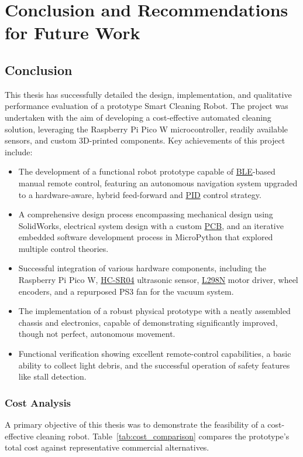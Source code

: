 \chapter{Conclusion and Recommendations for Future Work}
\label{chap:conclusion_future_work_new}

\section{Conclusion}
\label{sec:conclusion_summary_new}
This thesis has successfully detailed the design, implementation, and qualitative performance evaluation of a prototype Smart Cleaning Robot. The project was undertaken with the aim of developing a cost-effective automated cleaning solution, leveraging the Raspberry Pi Pico W microcontroller, readily available sensors, and custom 3D-printed components.
Key achievements of this project include:
\begin{itemize}
    \item The development of a functional robot prototype capable of \hyperref[term:ble]{BLE}-based manual remote control, featuring an autonomous navigation system upgraded to a hardware-aware, hybrid feed-forward and \hyperref[term:pid]{PID} control strategy.
    \item A comprehensive design process encompassing mechanical design using SolidWorks, electrical system design with a custom \hyperref[term:pcb]{PCB}, and an iterative embedded software development process in MicroPython that explored multiple control theories.
    \item Successful integration of various hardware components, including the Raspberry Pi Pico W, \hyperref[term:hcsr04]{HC-SR04} ultrasonic sensor, \hyperref[term:l298n]{L298N} motor driver, wheel encoders, and a repurposed PS3 fan for the vacuum system.
    \item The implementation of a robust physical prototype with a neatly assembled chassis and electronics, capable of demonstrating significantly improved, though not perfect, autonomous movement.
    \item Functional verification showing excellent remote-control capabilities, a basic ability to collect light debris, and the successful operation of safety features like stall detection.
\end{itemize}

\subsection{Cost Analysis}
\label{subsec:cost_analysis}
A primary objective of this thesis was to demonstrate the feasibility of a cost-effective cleaning robot. Table~\ref{tab:cost_comparison} compares the prototype's total cost against representative commercial alternatives.

